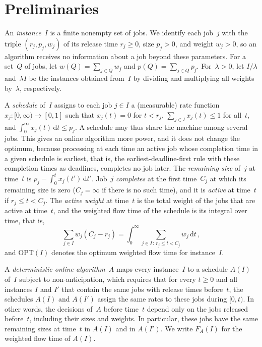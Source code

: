 \documentclass[11pt,letterpaper]{article}
\theoremstyle{definition}
\theoremstyle{remark}
\newcommand{\dd}{\,\mathrm{d}}
\newcommand{\OPT}{{\mathrm{OPT}}}
\begin{document}
\section{Preliminaries}\label{sec:prelim}

An \emph{instance}~$I$ is a finite nonempty set of jobs. We identify each job~$j$ with the triple $(r_j,p_j,w_j)$ of its release time $r_j\ge0$, size $p_j>0$, and weight $w_j>0$, so an algorithm receives no information about a job beyond these parameters. For a set~$Q$ of jobs, let $w(Q)=\sum_{j\in Q}w_j$ and $p(Q)=\sum_{j\in Q}p_j$. For~$\lambda>0$, let $I/\lambda$ and~$\lambda I$ be the instances obtained from~$I$ by dividing and multiplying all weights by~$\lambda$, respectively.

A \emph{schedule} of~$I$ assigns to each job $j\in I$ a (measurable) rate function $x_j\colon[0,\infty)\to[0,1]$ such that $x_j(t)=0$ for $t<r_j$, $\sum_{j\in I}x_j(t)\le1$ for all~$t$, and $\int_0^\infty x_j(t)\dd t\le p_j$. A schedule may thus share the machine among several jobs. This gives an online algorithm more power, and it does not change the optimum, because processing at each time an active job whose completion time in a given schedule is earliest, that is, the earliest-deadline-first rule with these completion times as deadlines, completes no job later. The \emph{remaining size} of~$j$ at time~$t$ is $p_j-\int_0^t x_j(t')\dd t'$. Job~$j$ \emph{completes} at the first time~$C_j$ at which its remaining size is zero ($C_j=\infty$ if there is no such time), and it is \emph{active} at time~$t$ if $r_j\le t<C_j$. The \emph{active weight} at time~$t$ is the total weight of the jobs that are active at time~$t$, and the weighted flow time of the schedule is its integral over time, that is,
\begin{equation*}
  \sum_{j\in I}w_j(C_j-r_j)=\int_0^\infty\sum_{j\in I\,:\,r_j\le t<C_j}w_j\dd t\,,
\end{equation*}
and $\OPT(I)$ denotes the optimum weighted flow time for instance~$I$.

A \emph{deterministic online algorithm}~$A$ maps every instance~$I$ to a schedule $A(I)$ of~$I$ subject to non-anticipation, which requires that for every $t\ge0$ and all instances $I$ and $I'$ that contain the same jobs with release times before~$t$, the schedules $A(I)$ and $A(I')$ assign the same rates to these jobs during $[0,t)$. In other words, the decisions of~$A$ before time~$t$ depend only on the jobs released before~$t$, including their sizes and weights. In particular, these jobs have the same remaining sizes at time~$t$ in $A(I)$ and in $A(I')$. We write $F_A(I)$ for the weighted flow time of $A(I)$. 
\end{document}
